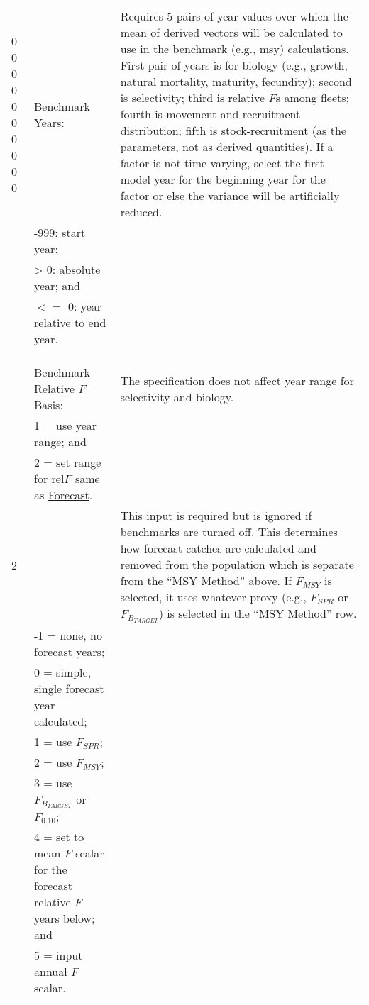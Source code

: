 \begin{landscape}
{\begin{longtable}{p{2cm} p{7cm} p{12cm}}
  \hline
  \multirow{1}{1cm}[-0.15cm]{\parbox{2cm}{0 0 0 0 0 0 0 0 0 0}} & Benchmark Years: & \multirow{1}{1cm}[-0.15cm]{\parbox{12cm}{Requires 5 pairs of year values over which the mean of derived vectors will be calculated to use in the benchmark (e.g., \gls{msy}) calculations. First pair of years is for biology (e.g., growth, natural mortality, maturity, fecundity); second is selectivity; third is relative $F$s among fleets; fourth is movement and recruitment distribution; fifth is stock-recruitment (as the parameters, not as derived quantities). If a factor is not time-varying, select the first model year for the beginning year for the factor or else the variance will be artificially reduced.}} \Tstrut\\
    & -999: start year; & \\
    & > 0: absolute year; and & \\
    & $<=$ 0: year relative to end year. & \Bstrut\\
    & & \\
    & & \\
    & & \\

  \pagebreak
  \hline
  1 & Benchmark Relative $F$ Basis: & \multirow{1}{1cm}[-0.2cm]{\parbox{12cm}{The specification does not affect year range for selectivity and biology.}} \Tstrut\\
    & 1 = use year range; and & \\
    & 2 = set range for $\text{rel}F$ same as \hyperlink{Fcast}{Forecast}. & \Bstrut\\

  \hline
  2 & \raisebox{0.1\ht\strutbox}{\hypertarget{Fcast}{Forecast:}} & \multirow{1}{1cm}[-0.25cm]{\parbox{12cm}{This input is required but is ignored if benchmarks are turned off. This determines how forecast catches are calculated and removed from the population which is separate from the ``MSY Method'' above. If $F_{MSY}$ is selected, it uses whatever proxy (e.g., $F_{SPR}$ or $F_{B_{TARGET}}$) is selected in the ``MSY Method'' row.}} \Tstrut\\
    & -1 = none, no forecast years; & \\
    & 0 = simple, single forecast year calculated; & \\
    & 1 = use $F_{SPR}$; & \\
    & 2 = use $F_{MSY}$; & \\
    & 3 = use $F_{B_{TARGET}}$ or $F_{0.10}$; & \\
    & 4 = set to mean $F$ scalar for the forecast relative $F$ years below; and & \\
    & 5 = input annual $F$ scalar. & \Bstrut\\


\end{longtable}}
\end{landscape}
